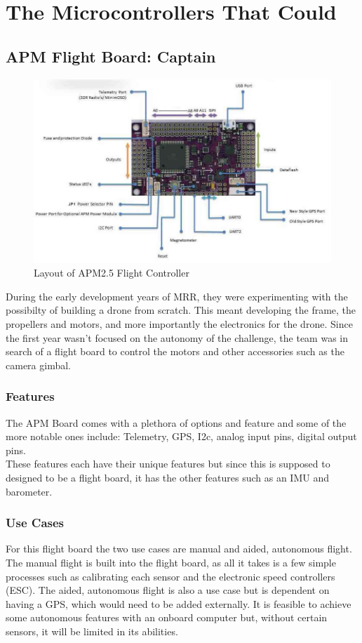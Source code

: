 \documentclass[conference,12pt, ]{IEEEtran}
\begin{document}
\section{The Microcontrollers That Could}
\subsection{APM Flight Board: Captain}
\begin{figure}
	\includegraphics[scale=0.40]{apm2.jpg}
	\caption {Layout of APM2.5 Flight Controller}
\end{figure}
During the early development years of MRR, they were experimenting with the possibilty of building a drone from scratch. This meant developing the frame, the propellers and motors, and more importantly the electronics for the drone. Since the first year wasn't focused on the autonomy of the challenge, the team was in search of a flight board to control the motors and other accessories such as the camera gimbal. 
\subsubsection{Features}
The APM Board comes with a plethora of options and feature and some of the more notable ones include: Telemetry, GPS, I2c, analog input pins, digital output pins. \cite{apm_board}\\
These features each have their unique features but since this is supposed to designed to be a flight board, it has the other features such as an IMU and barometer. 
\subsubsection{Use Cases}
For this flight board the two use cases are manual and aided, autonomous flight. The manual flight is built into the flight board, as all it takes is a few simple processes such as calibrating each sensor and the electronic speed controllers (ESC). The aided, autonomous flight is also a use case but is dependent on having a GPS, which would need to be added externally. It is feasible to achieve some autonomous features with an onboard computer but, without certain sensors, it will be limited in its abilities. 
\end{document}
